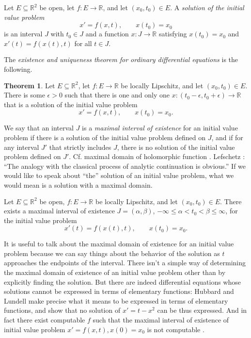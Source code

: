 \documentclass{article}
\theoremstyle{definition}
\newtheorem{theorem}{Theorem}
\begin{document}
Let $E \subseteq \mathbb{R}^2$ be open, let $f:E \to \mathbb{R}$, and let
$(x_0,t_0) \in E$. A {\em solution of the initial value problem}
\[
x'=f(x,t), \qquad x(t_0)=x_0
\]
is an interval $J$ with $t_0 \in J$ and a function $x:J \to \mathbb{R}$ satisfying $x(t_0)=x_0$ and $x'(t)=f(x(t),t)$ for all $t \in J$.

The {\em existence and uniqueness theorem for ordinary differential equations} is the following.

\begin{theorem}
Let $E \subseteq \mathbb{R}^2$, let $f:E \to \mathbb{R}$ be locally Lipschitz, and let $(x_0,t_0) \in E$. There is some
$\epsilon>0$ such that there is one and only one $x:(t_0-\epsilon,t_0+\epsilon) \to \mathbb{R}$ that is a solution of the initial value problem
\[
x'=f(x,t), \qquad x(t_0)=x_0.
\]
\end{theorem}

We say that an interval $J$ is a {\em maximal interval of existence} for an initial value problem if there is a solution
of the initial value problem defined on $J$, and if for any interval $J'$ that strictly includes $J$, there is no solution
of the initial value problem defined on $J'$. Cf. maximal domain of holomorphic function \cite[p.~112, \S 2]{remmert}. Lefschetz  \cite[p.~35]{lefschetz}: ``The analogy with the classical process of
analytic continuation is obvious.'' If we would like to speak about ``the'' solution of an initial value problem, what we would mean is a solution with a maximal domain.

Let $E \subseteq \mathbb{R}^2$ be open, $f:E \to \mathbb{R}$ be locally Lipschitz, and let
$(x_0,t_0) \in E$. There exists \cite[p.~51, Theorem 2.13]{teschl} a maximal interval of existence $J=(\alpha,\beta)$, $-\infty \leq \alpha< t_0 <\beta \leq \infty$,
for the initial value problem
\[
x'(t)=f(x(t),t), \qquad x(t_0)=x_0.
\]

It is useful to talk about the maximal domain of existence for an initial value problem
because we can say things about the behavior of the solution as $t$ approaches the endpoints
of the interval. There isn't a simple way of determining the maximal domain of existence of an initial value problem
other than by explicitly finding the solution. But there are indeed differential equations whose solutions cannot be expressed in terms of elementary functions: Hubbard 
and Lundell \cite{hubbard} make precise what it means to be expressed in terms of elementary functions, and
show that no solution of $x'=t-x^2$ can be thus expressed. And in fact there exist computable $f$ such that the maximal interval of existence of
initial value problem $x'=f(x,t), x(0)=x_0$
is not computable \cite{MR2485412}.
\end{document}
